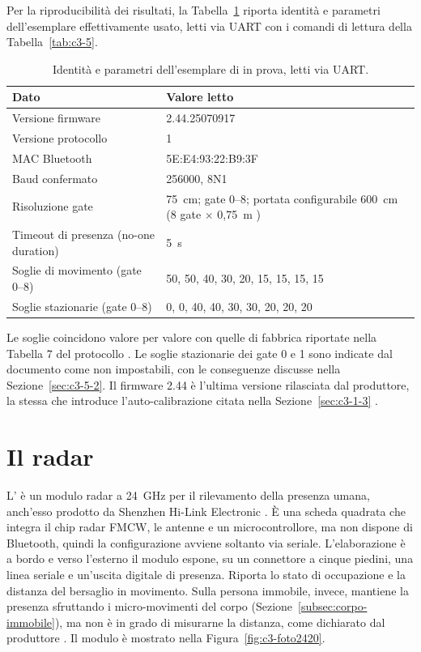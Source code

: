 Per la riproducibilità dei risultati, la Tabella~\ref{tab:c3-6} riporta identità e parametri dell'esemplare effettivamente usato, letti via UART con i comandi di lettura della Tabella~\ref{tab:c3-5}.

\begin{table}[!htb]
\centering
\caption{Identità e parametri dell'esemplare di \ldb{} in prova, letti via UART.}
\label{tab:c3-6}
\small
\begin{tabularx}{\linewidth}{@{}lX@{}}
\toprule
\textbf{Dato} & \textbf{Valore letto} \\
\midrule
Versione firmware & 2.44.25070917 \\
Versione protocollo & 1 \\
MAC Bluetooth & 5E:E4:93:22:B9:3F \\
Baud confermato & 256000, 8N1 \\
Risoluzione gate & 75~cm; gate 0–8; portata configurabile 600~cm (8 gate \(\times\) 0,75~m \cite[§5.2]{hilinkManualV104}) \\
Timeout di presenza (no-one duration) & 5~s \\
Soglie di movimento (gate 0–8) & 50, 50, 40, 30, 20, 15, 15, 15, 15 \\
Soglie stazionarie (gate 0–8) & 0, 0, 40, 40, 30, 30, 20, 20, 20 \\
\bottomrule
\end{tabularx}
\end{table}

Le soglie coincidono valore per valore con quelle di fabbrica riportate nella Tabella 7 del protocollo \cite{hilinkProtoV107}. Le soglie stazionarie dei gate 0 e 1 sono indicate dal documento come non impostabili, con le conseguenze discusse nella Sezione~\ref{sec:c3-5-2}. Il firmware 2.44 è l'ultima versione rilasciata dal produttore, la stessa che introduce l'auto-calibrazione citata nella Sezione~\ref{sec:c3-1-3} \cite{hilinkV244}.

\FloatBarrier
\section{Il radar \ldc{}}
\label{sec:c3-2}

L'\ldc{} è un modulo radar a 24~GHz per il rilevamento della presenza umana, anch'esso prodotto da Shenzhen Hi-Link Electronic \cite{hilinkManualLD2420}. È una scheda quadrata che integra il chip radar FMCW, le antenne e un microcontrollore, ma non dispone di Bluetooth, quindi la configurazione avviene soltanto via seriale. L'elaborazione è a bordo e verso l'esterno il modulo espone, su un connettore a cinque piedini, una linea seriale e un'uscita digitale di presenza. Riporta lo stato di occupazione e la distanza del bersaglio in movimento. Sulla persona immobile, invece, mantiene la presenza sfruttando i micro-movimenti del corpo (Sezione~\ref{subsec:corpo-immobile}), ma non è in grado di misurarne la distanza, come dichiarato dal produttore \cite[§8]{hilinkManualLD2420}. Il modulo è mostrato nella Figura~\ref{fig:c3-foto2420}.

